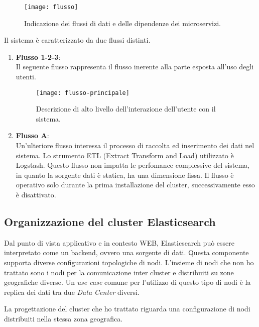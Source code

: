 \begin{figure}[htbp]
	\begin{center}
		\texttt{[image: flusso]}
		\caption{Indicazione dei flussi di dati e delle dipendenze dei microservizi.}
	\end{center}
\end{figure} 

\newpage 

Il sistema è caratterizzato da due flussi distinti.

\begin{enumerate}
	\item \textbf{Flusso 1-2-3}:  \\
	Il seguente flusso rappresenta il flusso inerente
	alla parte esposta all'uso degli utenti.
	\begin{figure}[htbp]
		\begin{center}
			\texttt{[image: flusso-principale]}
			\caption{Descrizione di alto livello dell'interazione dell'utente con il sistema.}
		\end{center}
	\end{figure} 
    \newpage  
	\item \textbf{Flusso A}: \\
	Un'ulteriore flusso interessa il processo di raccolta ed inserimento dei dati
	nel sistema. Lo strumento ETL (Extract Transform and Load) utilizzato è Logstash.
	Questo flusso non impatta le perfomance complessive del sistema, in quanto 
	la sorgente dati è statica, ha una dimensione fissa. Il flusso è operativo
	solo durante la prima installazione del cluster, successivamente esso 
	è disattivato.
\end{enumerate}

\subsection{Organizzazione del cluster Elasticsearch}

Dal punto di vista applicativo e in contesto WEB, Elasticsearch
può essere interpretato come un backend, ovvero una sorgente di dati. 
Questa componente supporta diverse configurazioni topologiche
di nodi. L'insieme di nodi che non ho trattato sono i nodi per 
la comunicazione inter cluster e distribuiti su zone geografiche diverse.
Un \textit{use case} comune per l'utilizzo di questo tipo di nodi è 
la replica dei dati tra due \textit{Data Center} diversi. 

La progettazione del cluster che ho trattato riguarda una configurazione
di nodi distribuiti nella stessa zona geografica.

